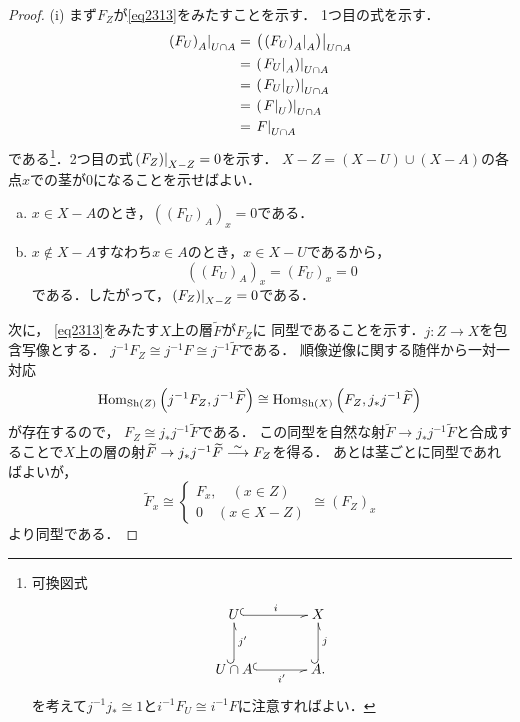 \begin{proof}
    (i) 
    まず\(F_Z\)が\eqref{eq2313}をみたすことを示す．
    1つ目の式を示す．
    \begin{align*}
        \mres[\left(F_U\right)_A]{U\cap A}
        &=\mres[{\left(\mres[\left(F_U\right)_A]{A}\right)}]{U\cap A}\\
        &=\mres[{\left(\mres[F_U]{A}\right)}]{U\cap A}\\
        &=\mres[\left({\mres[F_U]{U}}\right)]{U\cap A}\\
        &=\mres[\left({\mres[F]{U}}\right)]{U\cap A}\\
        &=\mres[F]{U\cap A}
    \end{align*}
    である\footnote{
        可換図式\[\vcenter{\xymatrix@C=36pt@R=26pt{
            U
            \ar@{^{(}-_>}[r]^-{i}
            &
            X
            \\
            U\cap A\ar@{^{(}-_>}[r]_-{i'}
            \ar@{^{(}-_>}[u]_-{j'}
            &
            A\ar@{^{(}-_>}[u]_-{j}.
        }}\]を考えて\(j^{-1}j_{\ast}\cong1\)と\(
            i^{-1}F_U\cong i^{-1}F
        \)に注意すればよい．
    }．2つ目の式\(\mres[\left(F_Z\right)]{X-Z}=0\)を示す．
    \(X-Z=(X-U)\cup(X-A)\)の各点\(x\)での茎が0になることを示せばよい．
    \begin{enumerate}[(a)]
        \item \(x\in X-A\)のとき，\(
            \left(\left(F_U\right)_A\right)_{x}=0
        \)である．
        \item \(x\notin X-A\)すなわち\(x\in A\)のとき，\(x\in X-U\)であるから，
        \[
            \left(\left(F_U\right)_A\right)_{x}
            =\left(F_U\right)_{x}
            =0
        \]である．したがって，\(\mres[\left(F_Z\right)]{X-Z}=0\)である．
    \end{enumerate}
    
    次に，
    \eqref{eq2313}をみたす\(X\)上の層\(\widetilde{F}\)が\(F_Z\)に
    同型であることを示す．\(j\colon Z\to X\)を包含写像とする．
    \(j^{-1}F_Z\cong j^{-1}F\cong j^{-1}\widetilde{F}\)である．
    順像逆像に関する随伴から一対一対応\[
        \Hom_{\Sh(Z)}\left(j^{-1}F_Z,j^{-1}\widetilde{F}\right)
        \cong
        \Hom_{\Sh(X)}\left(F_Z,j_{\ast}j^{-1}\widetilde{F}\right)
    \]
    が存在するので，
    \(F_Z\cong j_{\ast}j^{-1}\widetilde{F}\)である．
    この同型を自然な射\(
        \widetilde{F}\to j_{\ast}j^{-1}\widetilde{F}
    \)と合成することで\(X\)上の層の射\(
        \widetilde{F}
        \to j_{\ast}j^{-1}\widetilde{F}
        \simar F_Z
    \)を得る．
    あとは茎ごとに同型であればよいが，
    \[\widetilde{F}_x
    \cong\begin{cases}
        F_x,\quad (x\in Z)\\
        0\quad (x\in X-Z)
    \end{cases}
    \cong (F_Z)_x
    \]より同型である．


\end{proof}
